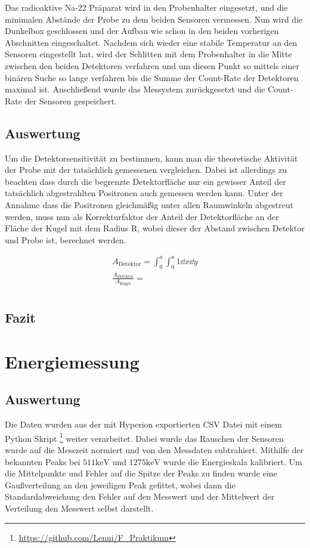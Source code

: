 \documentclass[12pt,twoside,a4paper]{scrartcl}
\begin{document}
			Das radioaktive Na-22 Präparat wird in den Probenhalter eingesetzt, und die minimalen Abstände der Probe zu dem beiden Sensoren vermessen. Nun wird die Dunkelbox geschlossen und der Aufbau wie schon in den beiden vorherigen Abschnitten eingeschaltet. Nachdem sich wieder eine stabile Temperatur an den Sensoren eingestellt hat, wird der Schlitten mit dem Probenhalter in die Mitte zwischen den beiden Detektoren verfahren und um diesen Punkt so mittels einer binären Suche so lange verfahren bis die Summe der Count-Rate der Detektoren maximal ist. Anschließend wurde das Messystem zurückgesetzt und die Count-Rate der Sensoren gespeichert.

		\subsection{Auswertung}

			Um die Detektorsensitivität zu bestimmen, kann man die theoretische Aktivität der Probe mit der tatsächlich gemessenen vergleichen.
			Dabei ist allerdings zu beachten dass durch die begrenzte Detektorfläche nur ein gewisser Anteil der tatsächlich abgestrahlten Positronen auch gemessen werden kann.
			Unter der Annahme dass die Positronen gleichmäßig unter allen Raumwinkeln abgestreut werden, muss nun als Korrekturfaktor der Anteil der Detektorfläche an der Fläche der Kugel mit dem Radius R, wobei dieser der Abstand zwischen Detektor und Probe ist, berechnet werden.

			\begin{align*}
				A_{\text{Detektor}} = \int_0^a \int_0^a 1 \dd{x} \dd{y} \\
				\frac{A_{\text{Detektor}}}{A_{\text{Kugel}}} = \\
			\end{align*}

		\subsection{Fazit}



	\section{Energiemessung}

	\subsection{Auswertung}

		Die Daten wurden aus der mit Hyperion exportierten CSV Datei mit einem Python Skript \footnote{\url{https://github.com/Lenni/F_Praktikum}} weiter verarbeitet. Dabei wurde das Rauschen der Sensoren wurde auf die Messzeit normiert und von den Messdaten subtrahiert. Mithilfe der bekannten Peaks bei $511 \si{\kilo \electronvolt}$ und $1275 \si{\kilo \electronvolt}$ wurde die Energieskala kalibriert. Um die Mittelpunkte und Fehler auf die Spitze der Peaks zu finden wurde eine Gaußverteilung an den jeweiligen Peak gefittet, wobei dann die Standardabweichung den Fehler auf den Messwert und der Mittelwert der Verteilung den Messwert selbst darstellt.
\end{document}
